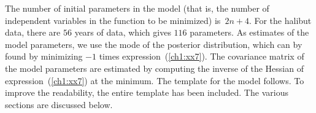 \documentclass{admbmanual}
\begin{document}
The number of initial parameters in the model (that is, the number of
independent variables in the function to be minimized) is~$2n+4$. For the
halibut data, there are $56$ years of data, which gives $116$ parameters. As
estimates of the model parameters, we use the mode of the posterior
distribution, which can by found by minimizing $-1$ times
expression~(\ref{ch1:xx7}).
The covariance matrix of the model parameters are estimated by computing the
inverse of the Hessian of expression~(\ref{ch1:xx7})
at the minimum. The template for the model follows. To improve the readability,
the entire template has been included. The various sections are discussed below.
\end{document}
